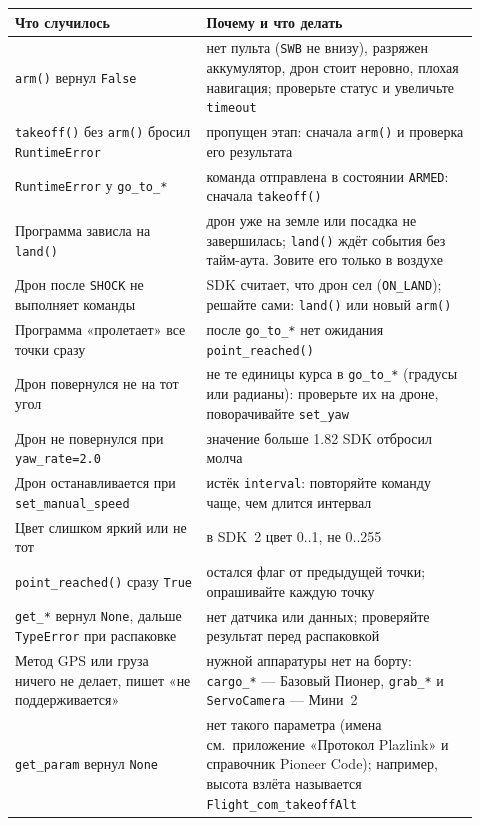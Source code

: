{\small
\begin{longtable}{@{}>{\raggedright\arraybackslash}p{0.38\linewidth}>{\raggedright\arraybackslash}p{0.54\linewidth}@{}}
\toprule
\textbf{Что случилось} & \textbf{Почему и что делать} \\
\midrule
\endhead
\verb|arm()| вернул \verb|False| & нет пульта (\texttt{SWB} не внизу), разряжен аккумулятор, дрон стоит неровно, плохая навигация; проверьте статус и увеличьте \verb|timeout| \\
\verb|takeoff()| без \verb|arm()| бросил \verb|RuntimeError| & пропущен этап: сначала \verb|arm()| и проверка его результата \\
\verb|RuntimeError| у \verb|go_to_*| & команда отправлена в состоянии \verb|ARMED|: сначала \verb|takeoff()| \\
Программа зависла на \verb|land()| & дрон уже на земле или посадка не завершилась; \verb|land()| ждёт события без тайм-аута. Зовите его только в воздухе \\
Дрон после \verb|SHOCK| не выполняет команды & SDK считает, что дрон сел (\verb|ON_LAND|); решайте сами: \verb|land()| или новый \verb|arm()| \\
Программа «пролетает» все точки сразу & после \verb|go_to_*| нет ожидания \verb|point_reached()| \\
Дрон повернулся не на тот угол & не те единицы курса в \verb|go_to_*| (градусы или радианы): проверьте их на дроне, поворачивайте \verb|set_yaw| \\
Дрон не повернулся при \verb|yaw_rate=2.0| & значение больше 1.82 SDK отбросил молча \\
Дрон останавливается при \verb|set_manual_speed| & истёк \verb|interval|: повторяйте команду чаще, чем длится интервал \\
Цвет слишком яркий или не тот & в SDK~2 цвет 0..1, не 0..255 \\
\verb|point_reached()| сразу \verb|True| & остался флаг от предыдущей точки; опрашивайте каждую точку \\
\verb|get_*| вернул \verb|None|, дальше \texttt{TypeError} при распаковке & нет датчика или данных; проверяйте результат перед распаковкой \\
Метод GPS или груза ничего не делает, пишет «не поддерживается» & нужной аппаратуры нет на борту: \verb|cargo_*| --- Базовый Пионер, \verb|grab_*| и \verb|ServoCamera| --- Мини~2 \\
\verb|get_param| вернул \verb|None| & нет такого параметра (имена см.\ приложение «Протокол Plazlink» и справочник Pioneer Code); например, высота взлёта называется \texttt{Flight\_com\_takeoffAlt} \\

\end{longtable}}
